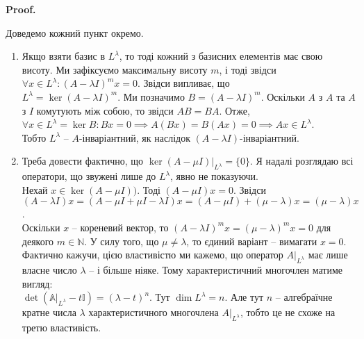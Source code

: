 \documentclass[a4paper, 10pt]{article}
\makeatletter
\theoremstyle{theoremdd}
\renewenvironment{proof}[1][Proof.\\]{\par
\pushQED{\hfill \qed}%
\normalfont \topsep6\p@\@plus6\p@\relax
\trivlist
\item\relax
{\bfseries
#1\@addpunct{.}}\hspace\labelsep\ignorespaces
}{%
\popQED\endtrivlist\@endpefalse
}
\makeatother
\begin{document}
\begin{proof}
Доведемо кожний пункт окремо.
\begin{enumerate}[wide=0pt,label={\arabic*)}]
\item Якщо взяти базис в $L^\lambda$, то тоді кожний з базисних елементів має свою висоту. Ми зафіксуємо максимальну висоту $m$, і тоді звідси $\forall x \in L^\lambda: (A-\lambda I)^m x = 0$. Звідси випливає, що \\ $L^\lambda = \ker (A-\lambda I)^m$. Ми позначимо $B = (A-\lambda I)^m$. Оскільки $A$ з $A$ та $A$ з $I$ комутують між собою, то звідси $AB = BA$. Отже, $\forall x \in L^\lambda = \ker B: B x =0 \implies A(Bx) = B(Ax) = 0 \implies Ax \in L^\lambda$.\\
Тобто $L^\lambda$ -- $A$-інваріантний, як наслідок $(A-\lambda I)$-інваріантний.

\item Треба довести фактично, що $\ker (A-\mu I)|_{L^\lambda} = \{0\}$. Я надалі розглядаю всі оператори, що звужені лише до $L^\lambda$, явно не показуючи.\\
Нехай $x \in \ker (A-\mu I))$. Тоді $(A-\mu I)x = 0$. Звідси\\
$(A-\lambda I)x = (A-\mu I + \mu I - \lambda I)x = (A-\mu I) + (\mu -\lambda)x = (\mu-\lambda)x$.\\
Оскільки $x$ -- кореневий вектор, то $(A-\lambda I)^m x = (\mu - \lambda)^m x = 0$ для деякого $m \in \mathbb{N}$. У силу того, що $\mu \neq \lambda$, то єдиний варіант -- вимагати $x =0$.
\bigskip \\
Фактично кажучи, цією властивістю ми кажемо, що оператор $A|_{L^\lambda}$ має лише власне число $\lambda$ -- і більше ніяке. Тому характеристичний многочлен матиме вигляд:\\
$\det(\mathbb{A}|_{L^{\lambda}} - t \mathbb{I}) = (\lambda - t)^n$. Тут $\dim L^{\lambda} = n$. Але тут $n$ -- алгебраїчне кратне числа $\lambda$ характеристичного многочлена $A|_{L^\lambda}$, тобто це не схоже на третю властивість.


\end{enumerate}
\end{proof}
\end{document}
